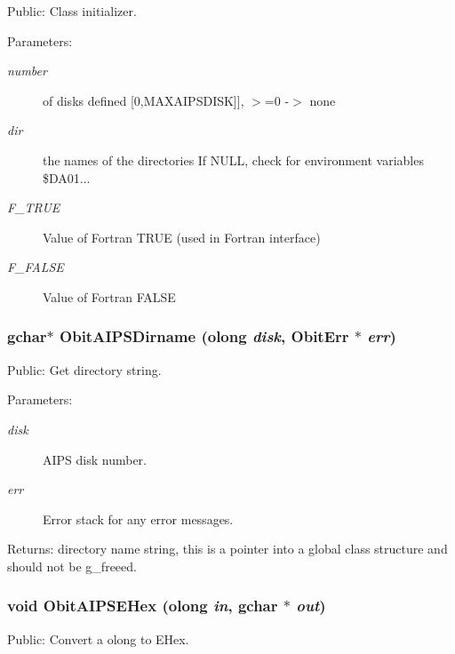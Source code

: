 Public: Class initializer. 

\begin{Desc}
\item[Parameters:]
\begin{description}
\item[{\em number}]of disks defined [0,MAXAIPSDISK]], $>$=0 -$>$ none \item[{\em dir}]the names of the directories If NULL, check for environment variables \$DA01... \item[{\em F\_\-TRUE}]Value of Fortran TRUE (used in Fortran interface) \item[{\em F\_\-FALSE}]Value of Fortran FALSE \end{description}
\end{Desc}
\subsubsection{\setlength{\rightskip}{0pt plus 5cm}gchar$\ast$ Obit\-AIPSDirname ({\bf olong} {\em disk}, {\bf Obit\-Err} $\ast$ {\em err})}\label{ObitAIPS_8c_a10}


Public: Get directory string. 

\begin{Desc}
\item[Parameters:]
\begin{description}
\item[{\em disk}]AIPS disk number. \item[{\em err}]Error stack for any error messages. \end{description}
\end{Desc}
\begin{Desc}
\item[Returns:]directory name string, this is a pointer into a global class structure and should not be g\_\-freeed. \end{Desc}
\subsubsection{\setlength{\rightskip}{0pt plus 5cm}void Obit\-AIPSEHex ({\bf olong} {\em in}, gchar $\ast$ {\em out})}\label{ObitAIPS_8c_a16}


Public: Convert a olong to EHex. 


